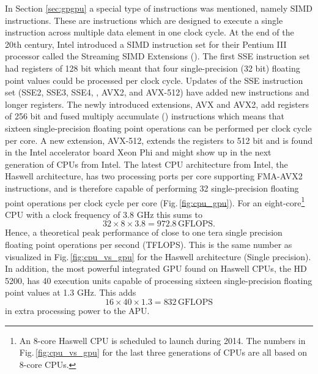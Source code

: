 In Section \ref{sec:gpgpu} a special type of instructions was mentioned, namely SIMD instructions. These are instructions which are designed to execute a single instruction across multiple data element in one clock cycle. At the end of the 20th century, Intel introduced a SIMD instruction set for their Pentium III processor called the Streaming SIMD Extensions (). The first SSE instruction set had registers of 128 bit which meant that four single-precision (32 bit) floating point values could be processed per clock cycle. Updates of the SSE instruction set (SSE2, SSE3, SSE4, , AVX2, and AVX-512) have added new instructions and longer registers. The newly introduced extensions, AVX and AVX2, add registers of 256 bit and fused multiply accumulate () instructions  which means that sixteen single-precision floating point operations can be performed per clock cycle per core. A new extension, AVX-512, extends the registers to 512 bit and is found in the Intel accelerator board  Xeon Phi and might show up in the next generation of CPUs from Intel. The latest CPU architecture from Intel, the Haswell architecture, has two processing ports per core supporting FMA-AVX2 instructions, and is therefore capable of performing 32 single-precision floating point operations per clock cycle per core (Fig.\,\ref{fig:cpu_gpu}). For an eight-core\footnote{An 8-core Haswell CPU is scheduled to launch during 2014. The numbers in Fig.\,\ref{fig:cpu_vs_gpu} for the last three generations of CPUs are all based on 8-core CPUs.} CPU with a clock frequency of 3.8 GHz this sums to 
\begin{equation}
32 \times 8 \times 3.8 = 972.8\,\text{GFLOPS}.
\end{equation}
Hence, a theoretical peak performance of close to one tera single precision floating point operations per second (TFLOPS). This is the same number as visualized in Fig.\,\ref{fig:cpu_vs_gpu} for the Haswell architecture (Single precision). In addition, the most powerful integrated GPU found on Haswell CPUs, the HD 5200, has 40 execution units capable of processing sixteen single-precision floating point values at 1.3 GHz. This adds
\begin{equation}
16 \times 40 \times 1.3 = 832\,\text{GFLOPS}
\end{equation}
in extra processing power to the APU.

